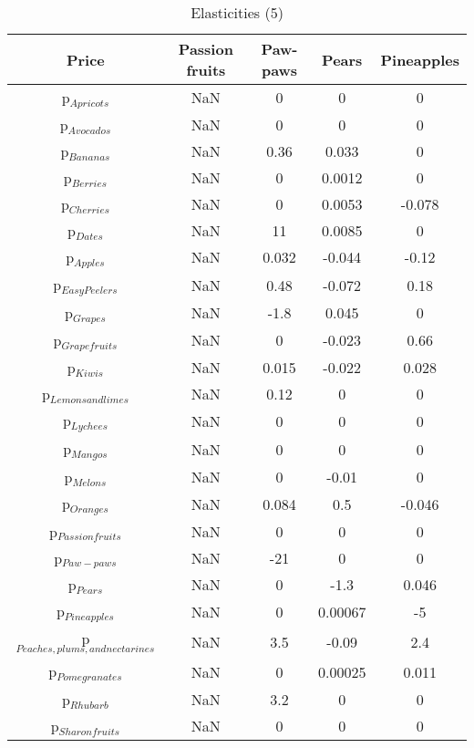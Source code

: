 \documentclass[11pt]{article}
\begin{document}
\begin{table}[h]
\caption{Elasticities (5)}
\label{Table: elasticities 5}
\begin{center}
\begin{tabular}{ccccc}
Price & Passion fruits & Paw-paws & Pears & Pineapples \\ \hline
p$_{Apricots}$ & NaN & 0 & 0 & 0 \\ 
p$_{Avocados}$ & NaN & 0 & 0 & 0 \\ 
p$_{Bananas}$ & NaN & 0.36 & 0.033 & 0 \\ 
p$_{Berries}$ & NaN & 0 & 0.0012 & 0 \\ 
p$_{Cherries}$ & NaN & 0 & 0.0053 & -0.078 \\ 
p$_{Dates}$ & NaN & 11 & 0.0085 & 0 \\ 
p$_{Apples}$ & NaN & 0.032 & -0.044 & -0.12 \\ 
p$_{Easy Peelers}$ & NaN & 0.48 & -0.072 & 0.18 \\ 
p$_{Grapes}$ & NaN & -1.8 & 0.045 & 0 \\ 
p$_{Grapefruits}$ & NaN & 0 & -0.023 & 0.66 \\ 
p$_{Kiwis}$ & NaN & 0.015 & -0.022 & 0.028 \\ 
p$_{Lemons and limes}$ & NaN & 0.12 & 0 & 0 \\ 
p$_{Lychees}$ & NaN & 0 & 0 & 0 \\ 
p$_{Mangos}$ & NaN & 0 & 0 & 0 \\ 
p$_{Melons}$ & NaN & 0 & -0.01 & 0 \\ 
p$_{Oranges}$ & NaN & 0.084 & 0.5 & -0.046 \\ 
p$_{Passion fruits}$ & NaN & 0 & 0 & 0 \\ 
p$_{Paw-paws}$ & NaN & -21 & 0 & 0 \\ 
p$_{Pears}$ & NaN & 0 & -1.3 & 0.046 \\ 
p$_{Pineapples}$ & NaN & 0 & 0.00067 & -5 \\ 
p$_{Peaches, plums, and nectarines}$ & NaN & 3.5 & -0.09 & 2.4 \\ 
p$_{Pomegranates}$ & NaN & 0 & 0.00025 & 0.011 \\ 
p$_{Rhubarb}$ & NaN & 3.2 & 0 & 0 \\ 
p$_{Sharon fruits}$ & NaN & 0 & 0 & 0 \\ 
\end{tabular}
\end{center}
\end{table}
\end{document}
